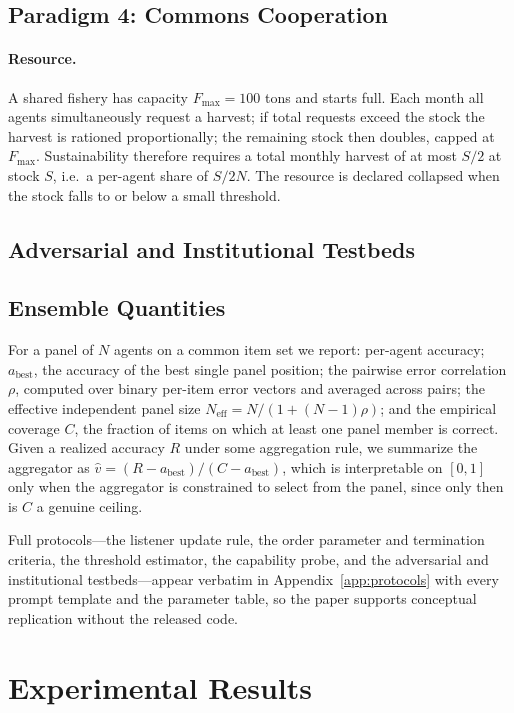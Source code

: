 \documentclass[manuscript,screen,review]{acmart}
\begin{document}
\subsection{Paradigm 4: Commons Cooperation}
\label{sec:methods-govsim}
\paragraph{Resource.} A shared fishery has capacity $F_{\max}=100$ tons and
starts full. Each month all agents simultaneously request a harvest; if total
requests exceed the stock the harvest is rationed proportionally; the remaining
stock then doubles, capped at $F_{\max}$. Sustainability therefore requires a
total monthly harvest of at most $S/2$ at stock $S$, i.e.\ a per-agent share of
$S/2N$. The resource is declared collapsed when the stock falls to or below a
small threshold.

\subsection{Adversarial and Institutional Testbeds}
\label{sec:methods-adv}
\subsection{Ensemble Quantities}
\label{sec:methods-ensemble}
For a panel of $N$ agents on a common item set we report: per-agent accuracy;
$a_{\mathrm{best}}$, the accuracy of the best single panel position; the pairwise
error correlation $\rho$, computed over binary per-item error vectors and averaged
across pairs; the effective independent panel size
$N_{\mathrm{eff}} = N / (1 + (N-1)\rho)$; and the empirical coverage $C$, the
fraction of items on which at least one panel member is correct. Given a realized
accuracy $R$ under some aggregation rule, we summarize the aggregator as
$\hat v = (R - a_{\mathrm{best}}) / (C - a_{\mathrm{best}})$, which is
interpretable on $[0,1]$ only when the aggregator is constrained to select from
the panel, since only then is $C$ a genuine ceiling.

\noindent Full protocols---the listener update rule, the order parameter and termination criteria, the threshold estimator, the capability probe, and the adversarial and institutional testbeds---appear verbatim in Appendix~\ref{app:protocols} with every prompt template and the parameter table, so the paper supports conceptual replication without the released code.

\section{Experimental Results}
\end{document}
